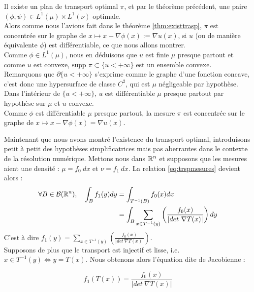 \documentclass[a4paper,12pt]{article}
\newcommand{\supp}{\text{supp }}
\begin{document}
\begin{preuve}
Il existe un plan de transport optimal $\pi$, et par le théorème précédent, une paire $(\phi,\psi)\in L^1(\mu)\times L^1(\nu)$ optimale. \\

Alors comme nous l'avions fait dans le théorème \eqref{thm:existtrasp}, $\pi$ est concentrée sur le graphe de $x\mapsto x-\nabla \phi(x):=\nabla u(x)$, si $u$ (ou de manière équivalente $\phi$) est différentiable, ce que nous allons montrer.\\

Comme $\phi\in L^1(\mu)$, nous en déduisons que $u$ est finie $\mu$ presque partout et comme $u$ est convexe, $\supp\pi\subset \{u<+\infty\}$ est un ensemble convexe.\\
Remarquons que $\partial \{u<+\infty\}$ s'exprime comme le graphe d'une fonction concave, c'est donc une hypersurface de classe $C^2$, qui est $\mu$ négligeable par hypothèse.\\
Dans l'intérieur de $\{u<+\infty\}$, $u$ est différentiable $\mu$ presque partout par hypothèse sur $\mu$ et $u$ convexe.\\
Comme $\phi$ est différentiable $\mu$ presque partout, la mesure $\pi$ est concentrée sur le graphe de $x\mapsto x-\nabla\phi(x)=\nabla u(x)$.
\end{preuve}

Maintenant que nous avons montré l'existence du transport optimal, introduisons petit à petit des hypothèses simplificatrices mais pas aberrantes dans le contexte de la résolution numérique. Mettons nous dans $\mathbb{R}^n$ et supposons que les mesures aient une densité : $\mu = f_0\ dx$ et $\nu = f_1\ dx$. La relation \eqref{eq:trspmesures} devient alors : 
\begin{align*}
\forall B \in\mathcal{B}(\mathbb{R}^n),\quad \int_B f_1(y)dy&=\int_{T^{-1}(B)} f_0(x) dx \\
&= \int_B \sum_{x\in T^{-1}(y)} \left(\frac{f_0(x)}{|det\ \nabla T(x)|}\right)dy\\
\end{align*}
C'est à dire $f_1(y) = \sum_{x\in T^{-1}(y)} \left(\frac{f_0(x)}{|det\ \nabla T(x)|}\right)$.\\
Supposons de plus que le transport est injectif et lisse, i.e. $x\in T^{-1}(y) \Leftrightarrow y=T(x)$. Nous obtenons alors l'équation dite de Jacobienne :
 
\begin{equation}
\tag{J}
f_1(T(x)) = \frac{f_0(x)}{|det\ \nabla T(x)|}
\label{eq:jacobienne}
\end{equation}
\end{document}

